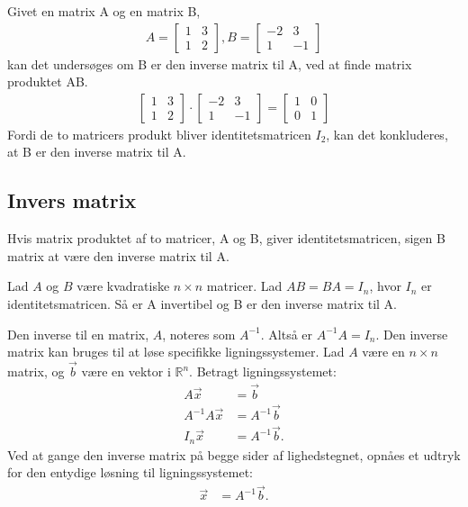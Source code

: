 \begin{eks}
Givet en matrix A og en matrix B,
\begin{align*}
A= \begin{bmatrix}
1 & 3 \\
1 & 2
\end{bmatrix},
B= \begin{bmatrix}
-2 & 3 \\
1 & -1
\end{bmatrix}
\end{align*}
kan det undersøges om B er den inverse matrix til A, ved at finde matrix produktet AB.
\begin{align*}
\begin{bmatrix}
1 & 3 \\
1 & 2
\end{bmatrix}
\cdot \begin{bmatrix}
-2 & 3 \\
1 & -1
\end{bmatrix}
= \begin{bmatrix}
1 & 0 \\
0 & 1
\end{bmatrix}
\end{align*}
Fordi de to matricers produkt bliver identitetsmatricen $I_2$, kan det konkluderes, at B er den inverse matrix til A.
\end{eks}




\subsection{Invers matrix}

Hvis matrix produktet af to matricer, A og B, giver identitetsmatricen, sigen B matrix at være den inverse matrix til A. 
\begin{defn}
Lad $A$ og $B$ være kvadratiske $n \times n$ matricer. Lad $AB=BA=I_n$, hvor $I_n$ er identitetsmatricen. Så er A invertibel og B er den inverse matrix til A. 
\label{def(inversmatrix)}
\end{defn}
Den inverse til en matrix, $A$, noteres som $A^{-1}$. Altså er $A^{-1}A=I_n$. Den inverse matrix kan bruges til at løse specifikke ligningssystemer. Lad $A$ være en $n \times n$ matrix, og $\vec{b}$ være en vektor i $\mathds{R}^n$. Betragt ligningssystemet: 
\begin{align*}
A \vec{x} &= \vec{b}\\
A^{-1} A \vec{x} &= A^{-1} \vec{b}\\
I_n \vec{x} &= A^{-1} \vec{b}.
\end{align*} 
Ved at gange den inverse matrix på begge sider af lighedstegnet, opnåes et udtryk for den entydige løsning til ligningssystemet: 
\begin{align}
\vec{x} &= A^{-1} \vec{b}.
\end{align} 

